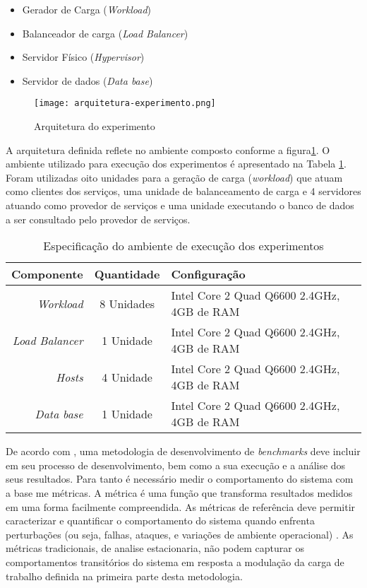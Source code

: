 \begin{itemize}
	\item Gerador de Carga (\textit{Workload})
	\item Balanceador de carga (\textit{Load Balancer})
	\item Servidor Físico (\textit{Hypervisor})
	\item Servidor de dados (\textit{Data base})
\end{itemize}


\begin{figure}[!htb]
	\centering
	\texttt{[image: arquitetura-experimento.png]}
	\caption{Arquitetura do experimento}
	\label{fig:arquitetura-experimento}
	\fautor
\end{figure}

A arquitetura definida reflete no ambiente composto conforme a figura\ref{fig:arquitetura-experimento}. O ambiente utilizado para execução dos experimentos é apresentado na Tabela \ref{tab:configuracao_maquinas}.
Foram utilizadas oito unidades para a geração de carga (\textit{workload}) que atuam como clientes dos serviços, uma unidade de balanceamento de carga e 4 servidores atuando como provedor de serviços e uma unidade executando o banco de dados a ser consultado pelo provedor de serviços.

\begin{table}[htb]
	\centering
	\caption{Especificação do ambiente de execução dos experimentos}
	\label{tab:configuracao_maquinas}
	\begin{tabularx}{\textwidth}{|r|c|X|} \hline\hline
		\textbf{Componente}    & \textbf{Quantidade} & \textbf{Configuração} \\ \hline
		\textit{Workload}      & 8 Unidades          & Intel Core 2 Quad Q6600 2.4GHz, 4GB de RAM \\
		\textit{Load Balancer} & 1 Unidade           & Intel Core 2 Quad Q6600 2.4GHz, 4GB de RAM \\
		\textit{Hosts}         & 4 Unidade           & Intel Core 2 Quad Q6600 2.4GHz, 4GB de RAM \\
		\textit{Data base}     & 1 Unidade           & Intel Core 2 Quad Q6600 2.4GHz, 4GB de RAM \\
		\hline
	\end{tabularx}
	\fdadospesquisa
\end{table}

De acordo com \cite{KaiSachs2010}, uma metodologia de desenvolvimento de \textit{benchmarks} deve incluir em seu processo de desenvolvimento, bem como a sua execução e a análise dos seus resultados. Para tanto é necessário medir o comportamento do sistema com a base me métricas. A métrica é uma função que transforma resultados medidos em uma forma facilmente compreendida. \cite{Folkerts2013} As métricas de referência deve permitir caracterizar e quantificar o comportamento do sistema quando enfrenta perturbações (ou seja, falhas, ataques, e variações de ambiente operacional) \cite{Marco2012}. As métricas tradicionais, de analise estacionaria, não podem capturar os comportamentos transitórios do sistema em resposta a modulação da carga de trabalho definida na primeira parte desta metodologia.

